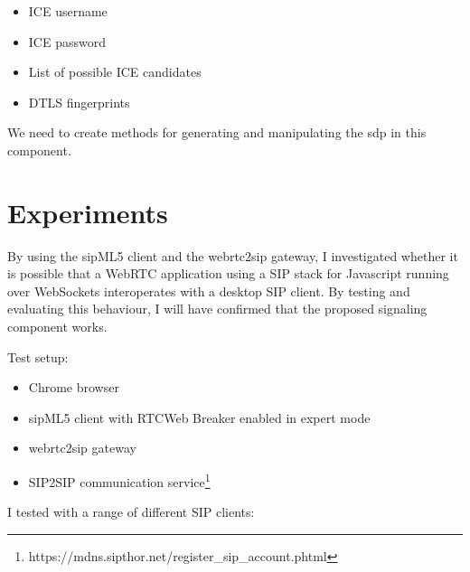 \begin{itemize}
\item{ICE username}
\item{ICE password}
\item{List of possible ICE candidates}
\item{DTLS fingerprint}s
\end{itemize}

We need to create methods for generating and manipulating the \gls{sdp} in this component.

\section{Experiments}
By using the sipML5 client and the webrtc2sip gateway, I investigated whether it is possible that a WebRTC application using a SIP stack for Javascript running over WebSockets interoperates with a desktop SIP client. By testing and evaluating this behaviour, I will have confirmed that the proposed signaling component works.

Test setup:
\begin{itemize}
\item Chrome browser
\item sipML5 client with RTCWeb Breaker enabled in expert mode
\item webrtc2sip gateway
\item SIP2SIP communication service\footnote{https://mdns.sipthor.net/register\_sip\_account.phtml}
\end{itemize}
I tested with a range of different SIP clients:

